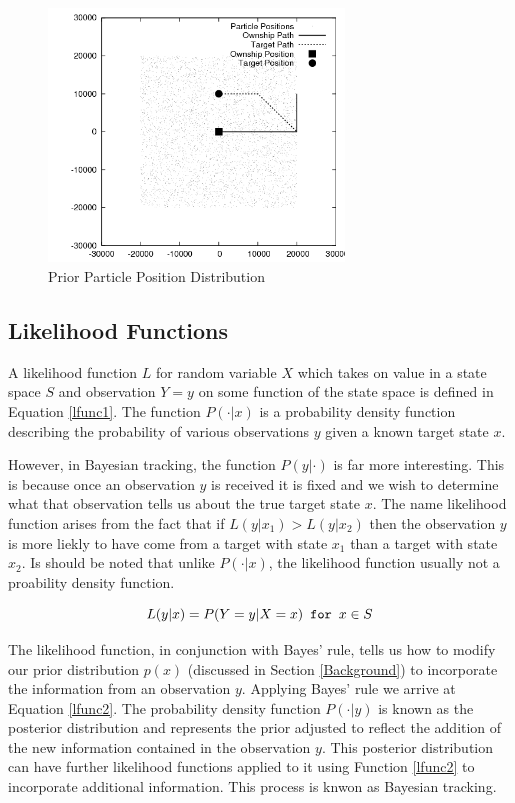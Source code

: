 \documentclass{article}
\begin{document}
\begin{figure}
\centering
\includegraphics[width=0.7\textwidth]{data/particles_prior.png}
\caption{Prior Particle Position Distribution}
\label{prior}
\end{figure}

\subsection{Likelihood Functions}
A likelihood function \(L\) for random variable \(X\) which takes on value in a state space \(S\) and observation \(Y=y\) on some function of the state space is defined in Equation \ref{lfunc1}. The function \(P(\cdot|x)\) is a probability density function describing the probability of various observations \(y\) given a known target state \(x\).

However, in Bayesian tracking, the function \(P(y|\cdot)\) is far more interesting. This is because once an observation \(y\) is received it is fixed and we wish to determine what that observation tells us about the true target state \(x\). The name likelihood function arises from the fact that if \(L(y|x_{1})>L(y|x_{2})\) then the observation \(y\) is more liekly to have come from a target with state \(x_{1}\) than a target with state \(x_{2}\). Is should be noted that unlike \(P(\cdot|x)\), the likelihood function usually not a proability density function\cite{bmtt}.

\begin{equation}\label{lfunc1}
L(y|x) = P( Y=y | X=x ) \verb! for ! x \in S
\end{equation}

The likelihood function, in conjunction with Bayes' rule, tells us how to modify our prior distribution \(p(x)\) (discussed in Section \ref{Background}) to incorporate the information from an observation \(y\). Applying Bayes' rule we arrive at Equation \ref{lfunc2}. The probability density function \(P(\cdot|y)\) is known as the posterior distribution and represents the prior adjusted to reflect the addition of the new information contained in the observation \(y\). This posterior distribution can have further likelihood functions applied to it using Function \ref{lfunc2} to incorporate additional information. This process is knwon as Bayesian tracking.
\end{document}
